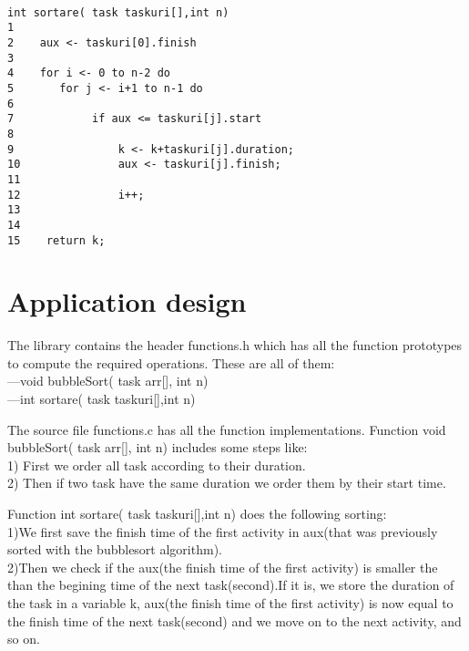 \documentclass[14pt]{article}
\begin{document}
\begin{lstlisting}

int sortare( task taskuri[],int n)
1
2    aux <- taskuri[0].finish
3                 
4    for i <- 0 to n-2 do 
5       for j <- i+1 to n-1 do
6        
7            if aux <= taskuri[j].start
8            
9                k <- k+taskuri[j].duration;
10               aux <- taskuri[j].finish;    
11               
12               i++;
13            
14        
15    return k;

\end{lstlisting}




\newpage
\section*{Application design}
\vspace{10 mm}
The library contains the header functions.h which has all the function prototypes to compute the required operations. These are all of them:
\\---void bubbleSort( task arr[], int n)
\\---int sortare( task taskuri[],int n)

\vspace{3 mm}
The source file functions.c has all the function implementations.
Function void bubbleSort( task arr[], int n) includes some steps like:
\\1) First we order all task according to their duration.
\\2) Then if two task have the same duration we order them by their start time.

\vspace{3 mm}
Function int sortare( task taskuri[],int n) does the following sorting: 
\\1)We first save the finish time of the first activity in aux(that was previously sorted with the bubblesort algorithm).
\\2)Then we check if the aux(the finish time of the first activity) is smaller the than the begining time of the next task(second).If it is, we store the duration of the task in a variable k, aux(the finish time of the first activity) is now equal to the finish time of the next task(second) and we move on to the next activity, and so on.
\\\vspace{2 mm}
\end{document}

